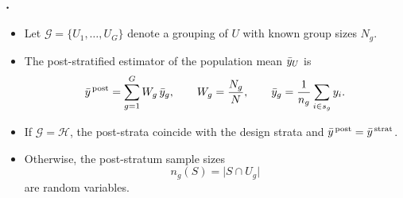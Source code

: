\documentclass{my_eth_beamer}
\numberwithin{equation}{section}
\begin{document}
\begin{frame}
    \frametitle{\insertsectionnumber.\insertsubsectionnumber~\insertsubsection}
    \begin{itemize}
    \setlength{\itemsep}{10pt}
        \item Let $\mathscr G = \{U_1,\ldots,U_G\}$ denote a grouping of $U$
            with known group sizes $N_g$.
        \item The \alert{post-stratified estimator} of the population mean
            $\bar{y}_U$ is
            \begin{equation*}
                \bar{y}^{\, \mathrm{post}}
                =
                \sum_{g=1}^G W_g\,\bar{y}_g,
                \qquad
                W_g=\frac{N_g}{N},
                \qquad
                \bar{y}_g
                =
                \frac{1}{n_g}\sum_{i\in s_g}y_i.
            \end{equation*}
        \item If $\mathscr G=\mathscr H$, the post-strata coincide with the
            design strata and $\bar{y}^{\, \mathrm{post}}=\bar{y}^{\, \mathrm{strat}}$.
        \item Otherwise, the post-stratum sample sizes
            \begin{equation*}
                n_g(S) = \vert S\cap U_g \vert
            \end{equation*}
            are \alert{random variables}.
    \end{itemize}
\end{frame}
\end{document}
